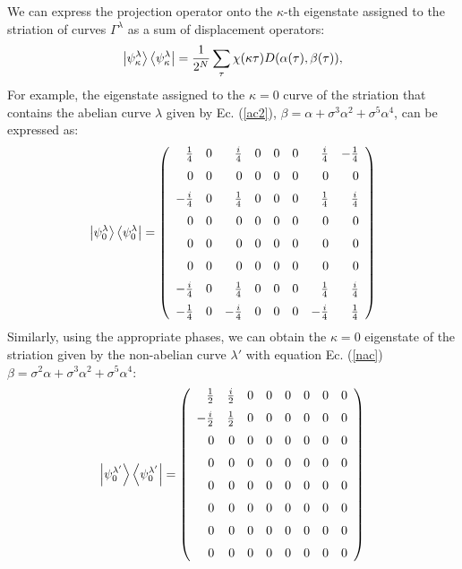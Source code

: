 \documentclass[a4paper]{article}
\begin{document}
  We can express the projection operator onto the
  $\kappa$-th eigenstate assigned to the striation of curves
  $\Gamma^\lambda$ as a sum of displacement operators:
  \begin{equation}
    \ket{\psi_\kappa^{\lambda}}
    \bra{\psi_\kappa^{\lambda}}
    = \frac{1}{2^{N}} \sum_{\tau}^{} 
    \chi(\kappa \tau) D(\alpha(\tau), \beta(\tau)),
  \end{equation}
  For example, the eigenstate assigned to the $\kappa = 0$
  curve of the striation that contains the abelian curve
  $\lambda$ given by Ec. (\ref{ac2}), $\beta = \alpha +
  \sigma^3 \alpha^2 + \sigma^{5} \alpha^{4}$, can be
  expressed as:
  \begin{equation}
    \ket{\psi_0^{\lambda}}
    \bra{\psi_0^{\lambda}}
    =
    \displaystyle \left(\begin{array}{rrrrrrrr}
    \frac{1}{4} & 0 & \frac{i}{4} & 0 & 0 & 0 & \frac{i}{4}
                & -\frac{1}{4} \\ [6pt]
    0 & 0 & 0 & 0 & 0 & 0 & 0 & 0 \\ [6pt]
    -\frac{i}{4} & 0 & \frac{1}{4} & 0 & 0 & 0 & \frac{1}{4}
                 & \frac{i}{4} \\ [6pt]
    0 & 0 & 0 & 0 & 0 & 0 & 0 & 0 \\ [6pt]
    0 & 0 & 0 & 0 & 0 & 0 & 0 & 0 \\ [6pt]
    0 & 0 & 0 & 0 & 0 & 0 & 0 & 0 \\ [6pt]
    -\frac{i}{4} & 0 & \frac{1}{4} & 0 & 0 & 0 & \frac{1}{4}
                 & \frac{i}{4} \\ [6pt]
    -\frac{1}{4} & 0 & -\frac{i}{4} & 0 & 0 & 0 &
    -\frac{i}{4} & \frac{1}{4}
    \end{array}\right)
  \end{equation}
  Similarly, using the appropriate phases, we can obtain the
  $\kappa = 0$ eigenstate of the striation given by the
  non-abelian curve $\lambda'$ with equation Ec. (\ref{nac})
  $\beta = \sigma^2 \alpha + \sigma^3 \alpha^2 + \sigma^{5}
  \alpha^{4}$:
  \begin{equation}
    \ket{\psi_0^{\lambda'}}
    \bra{\psi_0^{\lambda'}}
    =
    \displaystyle \left(\begin{array}{rrrrrrrr}
    \frac{1}{2} & \frac{i}{2} & 0 & 0 & 0 & 0 & 0 & 0 \\
    [6pt]
    -\frac{i}{2} & \frac{1}{2} & 0 & 0 & 0 & 0 & 0 & 0 \\
    [6pt]
    0 & 0 & 0 & 0 & 0 & 0 & 0 & 0 \\ [6pt]
    0 & 0 & 0 & 0 & 0 & 0 & 0 & 0 \\ [6pt]
    0 & 0 & 0 & 0 & 0 & 0 & 0 & 0 \\ [6pt]
    0 & 0 & 0 & 0 & 0 & 0 & 0 & 0 \\ [6pt]
    0 & 0 & 0 & 0 & 0 & 0 & 0 & 0 \\ [6pt]
    0 & 0 & 0 & 0 & 0 & 0 & 0 & 0
    \end{array}\right)
  \end{equation}
\end{document}
